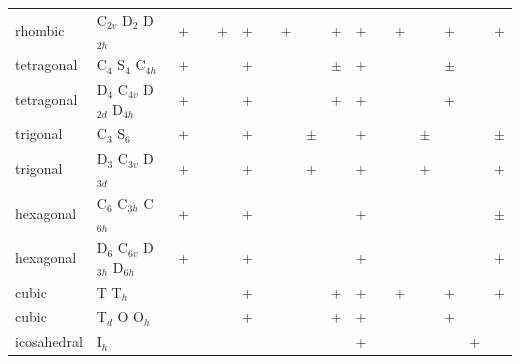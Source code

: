 \begin{landscape}
\begin{table}
\begin{tabular}{lllllllllllllllll}
rhombic    & C$_{2v}$ D$_{2}$ D$_{2h}$          &+      &       &+ &+      &       &+      &       &+      &+      &       &+      & &+      &       &+      \\
tetragonal & C$_{4}$ S$_{4}$ C$_{4h}$           &+      &       & &+      &       &       &       &$\pm$  &+      &       &       & &$\pm$  &       &       \\
tetragonal & D$_{4}$ C$_{4v}$ D$_{2d}$ D$_{4h}$ &+      &       & &+      &       &       &       &+      &+      &       &       & &+      &       &       \\
trigonal   & C$_{3}$ S$_{6}$                    &+      &       & &+      &       &       &$\pm$  &       &+      &       &       &$\pm$&      &       &$\pm$  \\
trigonal   & D$_{3}$ C$_{3v}$ D$_{3d}$          &+      &       & &+      &       &       &+      &       &+      &       &       &+ &       &       &+      \\
hexagonal  & C$_{6}$ C$_{3h}$ C$_{6h}$          &+      &       & &+      &       &       &       &       &+      &       &       & &       &       &$\pm$  \\
hexagonal  & D$_{6}$ C$_{6v}$ D$_{3h}$ D$_{6h}$ &+      &       & &+      &       &       &       &       &+      &       &       & &       &       &+      \\
cubic      & T         T$_{h}$                  &       &       & &+      &       &       &       &+      &+      &       &+      & &+      &       &+      \\
cubic      &   T$_{d}$  O O$_{h}$               &       &       & &+      &       &       &       &+      &+      &       &       & &+      &       &       \\
icosahedral & I$_h$                             &       &       & &       &       &       &       &       &+      &       &       & &       &+      &       \\
\end{tabular}
\end{table}

\end{landscape}
